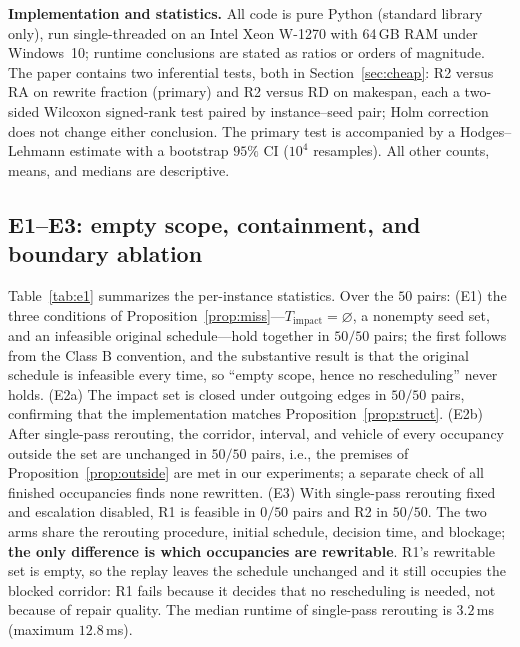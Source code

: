 \documentclass[manuscript,screen,review]{acmart}
\newcommand{\NPairs}{50}
\newcommand{\PassMiss}{\NPairs/\NPairs}      %
\newcommand{\FeasRone}{0/\NPairs}            %
\newcommand{\FeasRtwo}{\NPairs/\NPairs}      %
\newcommand{\PassClosed}{\NPairs/\NPairs}    %
\newcommand{\PassInvar}{\NPairs/\NPairs}     %
\newcommand{\MsRepairMed}{3.2}
\newcommand{\MsRepairMax}{12.8}
\begin{document}
\textbf{Implementation and statistics.}
All code is pure Python (standard library only), run single-threaded on an Intel Xeon W-1270 with 64\,GB RAM under Windows~10; runtime conclusions are stated as ratios or orders of magnitude.
The paper contains two inferential tests, both in Section~\ref{sec:cheap}: R2 versus RA on rewrite fraction (primary) and R2 versus RD on makespan, each a two-sided Wilcoxon signed-rank test paired by instance--seed pair;
Holm correction does not change either conclusion. The primary test is accompanied by a Hodges--Lehmann estimate with a bootstrap \(95\%\) CI (\(10^4\) resamples).
All other counts, means, and medians are descriptive.

\subsection{E1--E3: empty scope, containment, and boundary ablation}
\label{sec:e1}
\label{sec:e2}
\label{sec:e3}

Table~\ref{tab:e1} summarizes the per-instance statistics. Over the \(\NPairs\) pairs:
(E1) the three conditions of Proposition~\ref{prop:miss}---\(T_{\mathrm{impact}}=\varnothing\), a nonempty seed set, and an infeasible original schedule---hold together in \(\PassMiss\) pairs;
the first follows from the Class B convention, and the substantive result is that the original schedule is infeasible every time, so ``empty scope, hence no rescheduling'' never holds.
(E2a) The impact set is closed under outgoing edges in \(\PassClosed\) pairs, confirming that the implementation matches Proposition~\ref{prop:struct}.
(E2b) After single-pass rerouting, the corridor, interval, and vehicle of every occupancy outside the set are unchanged in \(\PassInvar\) pairs, i.e., the premises of Proposition~\ref{prop:outside} are met in our experiments; a separate check of all finished occupancies finds none rewritten.
(E3) With single-pass rerouting fixed and escalation disabled, R1 is feasible in \(\FeasRone\) pairs and R2 in \(\FeasRtwo\).
The two arms share the rerouting procedure, initial schedule, decision time, and blockage; \textbf{the only difference is which occupancies are rewritable}.
R1's rewritable set is empty, so the replay leaves the schedule unchanged and it still occupies the blocked corridor: R1 fails because it decides that no rescheduling is needed, not because of repair quality.
The median runtime of single-pass rerouting is \(\MsRepairMed\)\,ms (maximum \(\MsRepairMax\)\,ms).
\end{document}
